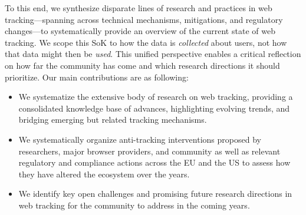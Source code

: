 To this end, we synthesize disparate lines of research and practices in web tracking---spanning across technical mechanisms, mitigations, and regulatory changes---to systematically provide an overview of the current state of web tracking.
%
We scope this SoK to how the data is \textit{collected} about users, not how that data might then be \textit{used}.
%
This unified perspective enables a critical reflection on how far the community has come and which research directions it should prioritize.
%
Our main contributions are as following:
%
\begin{itemize}
    \item We systematize the extensive body of research on web tracking, providing a consolidated knowledge base of advances, highlighting evolving trends, and bridging emerging but related tracking mechanisms.
    \item We systematically organize anti-tracking interventions proposed by researchers, major browser providers, and community as well as relevant regulatory and compliance actions across the EU and the US to assess how they have altered the ecosystem over the years.
    \item We identify key open challenges and promising future research directions in web tracking for the community to address in the coming years.
\end{itemize}
